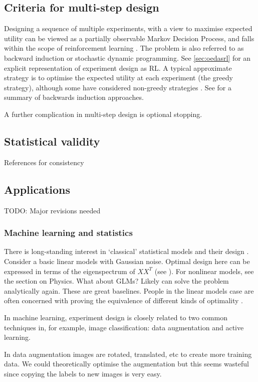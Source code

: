 \subsection{Criteria for multi-step design}
Designing a sequence of multiple experiments, with a view to maximise expected utility can be viewed as a partially observable Markov Decision Process, and falls within the scope of reinforcement learning \cite{pang2018}. The problem is also referred to as backward induction or stochastic dynamic programming. See \ref{sec:oedasrl} for an explicit representation of experiment design as RL. A typical approximate strategy is to optimise the expected utility at each experiment (the greedy strategy), although some have considered non-greedy strategies \cite{gonzalez2016} \cite{pang2018}. See \cite[sec 6.1]{ryan2015} for a summary of backwards induction approaches.

A further complication in multi-step design is optional stopping. 



\subsection{Statistical validity}
References for consistency


\subsection{Applications}
TODO: Major revisions needed

\subsubsection{Machine learning and statistics}
There is long-standing interest in `classical' statistical models and their design \cite{youssefreview}. Consider a basic linear models with Gaussian noise. Optimal design here can be expressed in terms of the eigenspectrum of $XX^T$ (see \cite{chaloner1984}). For nonlinear models, see the section on Physics. What about GLMs? Likely can solve the problem analytically again. These are great baselines. People in the linear models case are often concerned with proving the equivalence of different kinds of optimality \cite{youssefreview}.

In machine learning, experiment design is closely related to two common techniques in, for example, image classification: data augmentation and active learning.

In data augmentation images are rotated, translated, etc to create more training data. We could theoretically optimise the augmentation but this seems wasteful since copying the labels to new images is very easy.

